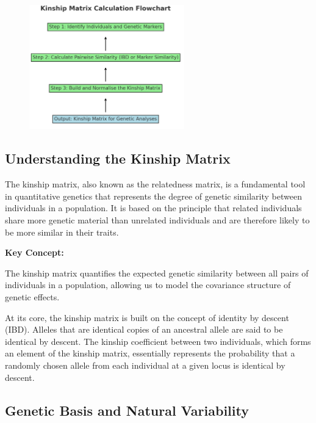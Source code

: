 \documentclass[12pt,a4paper]{article}
\newenvironment{keyconceptbox}[1][]
{\begin{basebox}[linecolor=uqblue]
\textbf{\color{uqblue}Key Concept:} \textit{#1}\par\noindent\ignorespaces}
{\end{basebox}}
\begin{document}
\begin{figure}[h]
    \centering
    \includegraphics[width=0.6\textwidth]{kinshipMatrix_FC.jpg} %
    \label{fig:Kinship Matrix Calculation}
\end{figure}
\subsection{Understanding the Kinship Matrix}

The kinship matrix, also known as the relatedness matrix, is a fundamental tool in quantitative genetics that represents the degree of genetic similarity between individuals in a population. It is based on the principle that related individuals share more genetic material than unrelated individuals and are therefore likely to be more similar in their traits.

\begin{keyconceptbox}
    
The kinship matrix quantifies the expected genetic similarity between all pairs of individuals in a population, allowing us to model the covariance structure of genetic effects.
\end{keyconceptbox}

At its core, the kinship matrix is built on the concept of identity by descent (IBD). Alleles that are identical copies of an ancestral allele are said to be identical by descent. The kinship coefficient between two individuals, which forms an element of the kinship matrix, essentially represents the probability that a randomly chosen allele from each individual at a given locus is identical by descent.

\subsection{Genetic Basis and Natural Variability}
\end{document}

